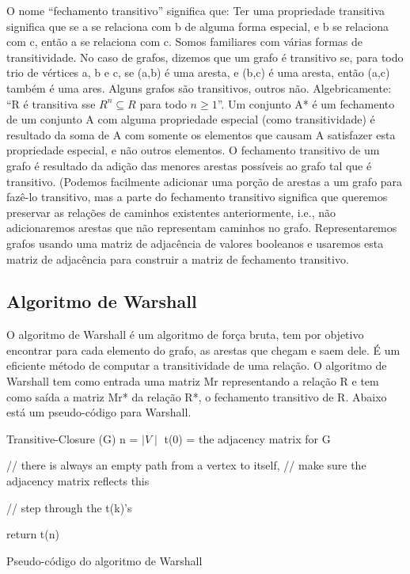 \documentclass[a4paper,12pt]{article}
\begin{document}
O nome “fechamento transitivo” significa que:
	Ter uma propriedade transitiva significa que se a se relaciona com b de alguma forma especial, e b se relaciona com c, então a se relaciona com c. Somos familiares com várias formas de transitividade. No caso de grafos, dizemos que um grafo é transitivo se, para todo trio de vértices a, b e c, se (a,b) é uma aresta, e (b,c) é uma aresta, então (a,c) também é uma ares. Alguns grafos são transitivos, outros não. Algebricamente: “R é transitiva sse $R^n \subseteq R$ para todo $n \geq 1$”. 
	Um conjunto A* é um fechamento de um conjunto A com alguma propriedade especial (como transitividade) é resultado da soma de A com somente os elementos que causam A satisfazer esta propriedade especial, e não outros elementos. O fechamento transitivo de um grafo é resultado da adição das menores arestas possíveis ao grafo tal que é transitivo. (Podemos facilmente adicionar uma porção de arestas a um grafo para fazê-lo transitivo, mas a parte do fechamento transitivo significa que queremos preservar as relações de caminhos existentes anteriormente, i.e., não adicionaremos arestas que não representam caminhos no grafo.
	Representaremos grafos usando uma matriz de adjacência de valores booleanos e usaremos esta matriz de adjacência para construir a matriz de fechamento transitivo. 

\subsection{Algoritmo de Warshall}
	
O algoritmo de Warshall é um algoritmo de força bruta, tem por objetivo encontrar para cada elemento do grafo, as arestas que chegam e saem dele. É um eficiente método de computar a transitividade de uma relação. O algoritmo de Warshall tem como entrada uma matriz Mr representando a relação R e tem como saída a matriz Mr* da relação R*, o fechamento transitivo de R. Abaixo está um pseudo-código para Warshall.

\begin{algorithm}[H]
Transitive-Closure (G)\;
        n = $\mid V\mid$\;
        t(0) = the adjacency matrix for G\;

        // there is always an empty path from a vertex to itself,
        // make sure the adjacency matrix reflects this


        // step through the t(k)'s\;

        return t(n)\;
	\caption{Pseudo-código do algoritmo de Warshall}
\end{algorithm}
\end{document}
